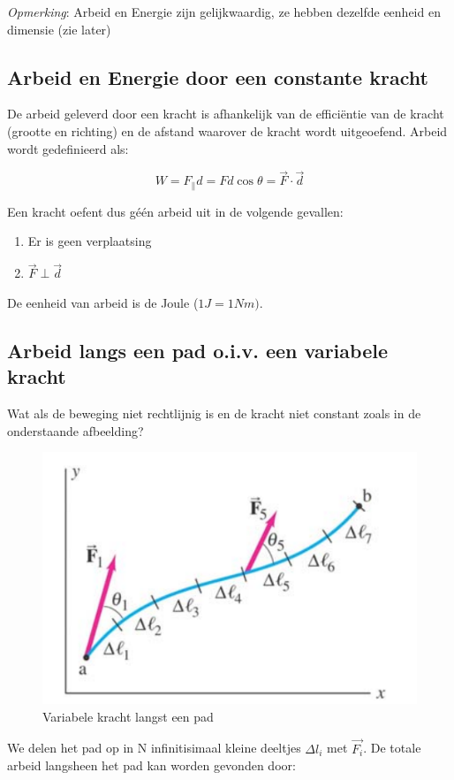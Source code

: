 \documentclass[12pt,a4paper]{article}
\begin{document}
    \emph{Opmerking}: Arbeid en Energie zijn gelijkwaardig, ze hebben dezelfde eenheid en dimensie (zie later)
    
    \subsection{Arbeid en Energie door een constante kracht}
    De arbeid geleverd door een kracht is afhankelijk van de efficiëntie van de kracht (grootte en richting) en de afstand waarover de kracht wordt uitgeoefend. 
    Arbeid wordt gedefinieerd als: 
    
    $$ W = F_{\parallel }d = Fd\cos{\theta} = \vec{F} \cdot \vec{d}$$
    
    Een kracht oefent dus géén arbeid uit in de volgende gevallen:
    \begin{enumerate}
    	\item Er is geen verplaatsing
    	\item $\vec{F} \perp \vec{d}$
    \end{enumerate}
    
    De eenheid van arbeid is de Joule ($1J = 1Nm)$.
    
    \subsection{Arbeid langs een pad o.i.v. een variabele kracht}
    Wat als de beweging niet rechtlijnig is en de kracht niet constant zoals in de onderstaande afbeelding?
    
    \begin{figure}[h]
    	\centering
	\includegraphics[width=0.6\linewidth]{variabele_kracht}
    	\caption{Variabele kracht langst een pad}
        	\label{variabele_kracht}
    \end{figure}
    
    We delen het pad op in N infinitisimaal kleine deeltjes $\Delta l_i$ met $\vec{F_i}$. De totale arbeid langsheen het pad kan worden gevonden door:
    
\end{document}
